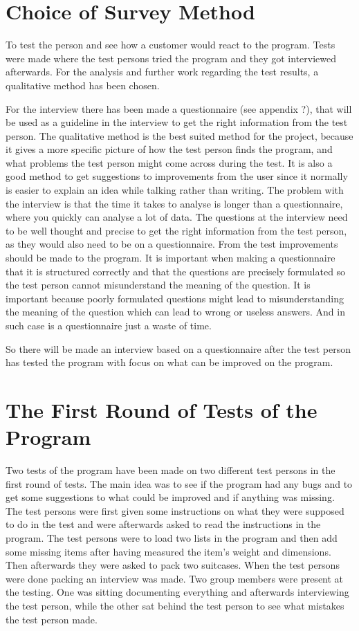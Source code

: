 \section{Choice of Survey Method}
To test the person and see how a customer would react to the program. Tests were made where the test persons tried the program and they got interviewed afterwards. For the analysis and further work regarding the test results, a qualitative method has been chosen.

For the interview there has been made a questionnaire (see appendix ?), that will be used as a guideline in the interview to get the right information from the test person. The qualitative method is the best suited method for the project, because it gives a more specific picture of how the test person finds the program, and what problems the test person might come across during the test. It is also a good method to get suggestions to improvements from the user since it normally is easier to explain an idea while talking rather than writing. The problem with the interview is that the time it takes to analyse is longer than a questionnaire, where you quickly can analyse a lot of data. The questions at the interview need to be well thought and precise to get the right information from the test person, as they would also need to be on a questionnaire. From the test improvements should be made to the program. 
It is important when making a questionnaire that it is structured correctly and that the questions are precisely formulated so the test person cannot misunderstand the meaning of the question. It is important because poorly formulated questions might lead to misunderstanding the meaning of the question which can lead to wrong or useless answers. And in such case is a questionnaire just a waste of time.

So there will be made an interview based on a questionnaire after the test person has tested the program with focus on what can be improved on the program.

\section{The First Round of Tests of the Program}
Two tests of the program have been made on two different test persons in the first round of tests. The main idea was to see if the program had any bugs and to get some suggestions to what could be improved and if anything was missing. The test persons were first given some instructions on what they were supposed to do in the test and were afterwards asked to read the instructions in the program. The test persons were to load two lists in the program and then add some missing items after having measured the item's weight and dimensions. Then afterwards they were asked to pack two suitcases. When the test persons were done packing an interview was made. Two group members were present at the testing. One was sitting documenting everything and afterwards interviewing the test person, while the other sat behind the test person to see what mistakes the test person made.

